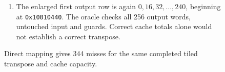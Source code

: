 \begin{figure}[htbp]
\begin{minipage}{\linewidth}
\begin{enumerate}
      \item The enlarged first output row is again $0,16,32,\ldots,240$, beginning at \texttt{0x10010440}. The oracle checks all 256 output words, untouched input and guards. Correct cache totals alone would not establish a correct transpose.
    \end{enumerate}
  \end{minipage}
  \caption{Direct mapping gives 344 misses for the same completed tiled transpose and cache capacity.}
  \label{capture:011-matrix-transpose-f04-direct}
  \label{transpose-f04-direct}
\end{figure}
\par
